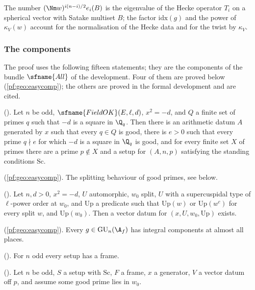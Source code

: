 The number $(\Nm w)^{i(n-i)/2}e_i(B)$ is the eigenvalue of the Hecke operator $T_i$ on a spherical vector with Satake
multiset $B$; the factor $\mathrm{idx}(g)$ and the power of $\kappa_V(w)$ account for the normalisation of the Hecke data and
for the twist by $\kappa_V$.

\subsubsection{The components}

The proof uses the following fifteen statements; they are the components of the bundle $\sfname{All}$ of the
development. Four of them are proved below (\cref{pf:geo:easycomp}); the others are proved in the formal development
and are cited.
\begin{description}[style=unboxed,leftmargin=1em,nosep]
\item[$\sfname{DatEx}$] (). Let $n$ be odd, $\sfname{FieldOK}(E,\ell,d)$,
  $x^2=-d$, and $Q$ a finite set of primes $q$ such that $-d$ is a square in $\Q_q$. Then there is an arithmetic datum $A$
  generated by $x$ such that every $q\in Q$ is good, there is $e>0$ such that every prime $q\nmid e$ for which $-d$ is a
  square in $\Q_q$ is good, and for every finite set $X$ of primes there are a prime $p\notin X$ and a setup for $(A,n,p)$
  satisfying the standing conditions $\mathrm{Sc}$.
\item[$\sfname{Sides}$] (\cref{pf:geo:easycomp}). The splitting behaviour of good primes, see below.
\item[$\sfname{VecEx}$] (). Let $n,d>0$, $x^2=-d$, $U$ automorphic,
  $w_0$ split, $U$ with a supercuspidal type of $\ell$-power order at $w_0$, and $\mathrm{Up}$ a predicate such that
  $\mathrm{Up}(w)$ or $\mathrm{Up}(w^c)$ for every split $w$, and $\mathrm{Up}(w_0)$. Then a vector datum for $(x,U,w_0,\mathrm{Up})$
  exists.
\item[$\sfname{IntCof}$] (\cref{pf:geo:easycomp}). Every $g\in\geoGU_n(\A_f)$ has integral components at almost all places.
\item[$\sfname{FrameEx}$] (). For $n$ odd every setup has a frame.
\item[$\sfname{SpecTop}$] (). Let $n$ be odd, $S$ a setup with
  $\mathrm{Sc}$, $F$ a frame, $x$ a generator, $V$ a vector datum off $p$, and assume some good prime lies in $w_0$.

\end{description}
